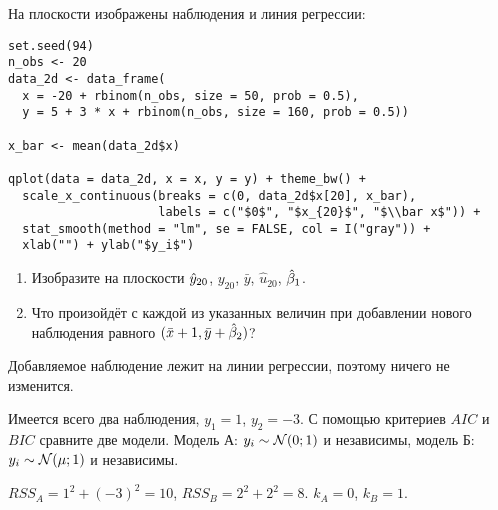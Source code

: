 \begin{problem}
На плоскости изображены наблюдения и линия регрессии:



\begin{verbatim}
set.seed(94)
n_obs <- 20
data_2d <- data_frame(
  x = -20 + rbinom(n_obs, size = 50, prob = 0.5),
  y = 5 + 3 * x + rbinom(n_obs, size = 160, prob = 0.5))

x_bar <- mean(data_2d$x)

qplot(data = data_2d, x = x, y = y) + theme_bw() +
  scale_x_continuous(breaks = c(0, data_2d$x[20], x_bar),
                     labels = c("$0$", "$x_{20}$", "$\\bar x$")) +
  stat_smooth(method = "lm", se = FALSE, col = I("gray")) +
  xlab("") + ylab("$y_i$")
\end{verbatim}




\begin{minipage}{\textwidth}
\begin{tikzpicture}[scale = 0.025]

\end{tikzpicture}
\end{minipage}


\begin{enumerate}
\item Изобразите на плоскости $\hy_{20}$, $y_{20}$, $\bar y$, $\hat u_{20}$, $\hb_1$.
\item Что произойдёт с каждой из указанных величин при добавлении нового наблюдения равного $(\bar x + 1, \bar y + \hb_2)$?
\end{enumerate}
\begin{sol}
Добавляемое наблюдение лежит на линии регрессии, поэтому ничего не изменится.
\end{sol}
\end{problem}


\begin{problem}
  Имеется всего два наблюдения, $y_1 = 1$, $y_2 = -3$. С помощью критериев $AIC$ и $BIC$ сравните две модели. Модель А: $y_i \sim \cN(0; 1)$ и независимы, модель Б: $y_i \sim \cN(\mu; 1)$ и независимы.
\begin{sol}
  $RSS_A = 1^2 + (-3)^2 = 10$, $RSS_B= 2^2 + 2^2 = 8$. $k_A = 0$, $k_B=1$.
\end{sol}
\end{problem}


